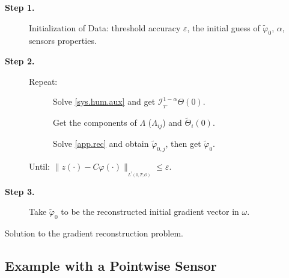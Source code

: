 \documentclass{article}
\begin{document}
\medskip

\begin{algorithm}[H]	
\SetAlgoLined
\vspace*{0.5cm}
\begin{description}
\item[\textbf{Step 1. }] Initialization of Data: 
threshold accuracy $\varepsilon$, the initial guess 
of $\tilde{\varphi}_0$, $\alpha$, sensors properties.
		
\item[\textbf{Step 2. }] Repeat:
		
\begin{description}
\item[\textbullet] Solve \eqref{sys.hum.aux} 
and get $\mathcal{I}_{_{T^-}}^{1-\alpha}\Theta(0)$.
			
\item[\textbullet] Get the components of $\Lambda$ 
($\Lambda_{ij}$) and $\tilde{\Theta}_i(0)$.
			
\item[\textbullet] Solve \eqref{app.rec} and obtain 
$\tilde{\varphi}_{0,j}$, then get $\tilde{\varphi}_0$.
\end{description}
Until: $\|z(\cdot) -C\varphi(\cdot)\|_{_{L^{^2}(0,T;\mathcal{O})}} \leq \varepsilon$.
	
\item[\textbf{Step 3.}] Take $\tilde{\varphi}_0$ 
to be the reconstructed initial gradient vector in $\omega$.
\end{description}
\caption{\label{alg1} Solution to the gradient reconstruction problem.}
\end{algorithm}


\subsection{Example with a Pointwise Sensor}
\label{sec:ex1}
\end{document}
